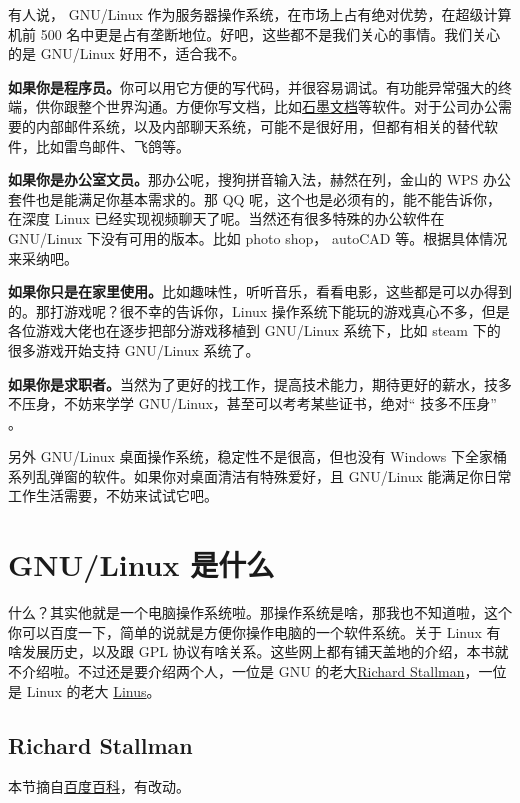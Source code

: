 \documentclass[doctor,openright,twoside]{sjtuthesis}
\theoremstyle{plain}
\theoremstyle{definition}
\theoremstyle{remark}
\theoremstyle{ocrenumbox}
\theoremstyle{plain}
\begin{document}
有人说， GNU/Linux 作为服务器操作系统，在市场上占有绝对优势，在超级计算机前 500 名中更是占有垄断地位。好吧，这些都不是我们关心的事情。我们关心的是 GNU/Linux 好用不，适合我不。

\textbf{如果你是程序员。}你可以用它方便的写代码，并很容易调试。有功能异常强大的终端，供你跟整个世界沟通。方便你写文档，比如\href{https://shimo.im/}{石墨文档}等软件。对于公司办公需要的内部邮件系统，以及内部聊天系统，可能不是很好用，但都有相关的替代软件，比如雷鸟邮件、飞鸽等。

\textbf{如果你是办公室文员。}那办公呢，搜狗拼音输入法，赫然在列，金山的 WPS 办公套件也是能满足你基本需求的。那 QQ 呢，这个也是必须有的，能不能告诉你，在深度 Linux 已经实现视频聊天了呢。当然还有很多特殊的办公软件在 GNU/Linux 下没有可用的版本。比如 photo shop， autoCAD 等。根据具体情况来采纳吧。

\textbf{如果你只是在家里使用。}比如趣味性，听听音乐，看看电影，这些都是可以办得到的。那打游戏呢？很不幸的告诉你，Linux 操作系统下能玩的游戏真心不多，但是各位游戏大佬也在逐步把部分游戏移植到 GNU/Linux 系统下，比如 steam 下的很多游戏开始支持 GNU/Linux 系统了。

\textbf{如果你是求职者。}当然为了更好的找工作，提高技术能力，期待更好的薪水，技多不压身，不妨来学学 GNU/Linux，甚至可以考考某些证书，绝对`` 技多不压身'' 。

另外 GNU/Linux 桌面操作系统，稳定性不是很高，但也没有 Windows 下全家桶系列乱弹窗的软件。如果你对桌面清洁有特殊爱好，且 GNU/Linux 能满足你日常工作生活需要，不妨来试试它吧。

\hypertarget{gnulinux--1}{%
\section{GNU/Linux 是什么}\label{gnulinux--1}}

什么？其实他就是一个电脑操作系统啦。那操作系统是啥，那我也不知道啦，这个你可以百度一下，简单的说就是方便你操作电脑的一个软件系统。关于 Linux 有啥发展历史，以及跟 GPL 协议有啥关系。这些网上都有铺天盖地的介绍，本书就不介绍啦。不过还是要介绍两个人，一位是 GNU 的老大\href{http://www.stallman.org/}{Richard Stallman}，一位是 Linux 的老大 \href{https://en.wikipedia.org/wiki/Linus_Torvalds}{Linus}。

\hypertarget{richard-stallman}{%
\subsection{Richard Stallman}\label{richard-stallman}}

本节摘自\href{https://baike.baidu.com/item/\%E7\%90\%86\%E6\%9F\%A5\%E5\%BE\%B7\%C2\%B7\%E9\%A9\%AC\%E4\%BF\%AE\%C2\%B7\%E6\%96\%AF\%E6\%89\%98\%E6\%9B\%BC?fromtitle=Richard+Stallman\&fromid=9336362}{百度百科}，有改动。
\end{document}
